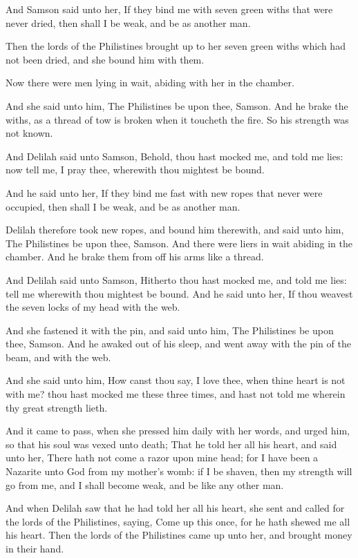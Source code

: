 \verse And Samson said unto her, If they bind me with seven green withs that were never dried, then shall I be weak, and be as another man.

\verse Then the lords of the Philistines brought up to her seven green withs which had not been dried, and she bound him with them.

\verse Now there were men lying in wait, abiding with her in the chamber.

And she said unto him, The Philistines be upon thee, Samson. And he brake the withs, as a thread of tow is broken when it toucheth the fire. So his strength was not known.

\verse And Delilah said unto Samson, Behold, thou hast mocked me, and told me lies: now tell me, I pray thee, wherewith thou mightest be bound.

\verse And he said unto her, If they bind me fast with new ropes that never were occupied, then shall I be weak, and be as another man.

\verse Delilah therefore took new ropes, and bound him therewith, and said unto him, The Philistines be upon thee, Samson. And there were liers in wait abiding in the chamber. And he brake them from off his arms like a thread.

\verse And Delilah said unto Samson, Hitherto thou hast mocked me, and told me lies: tell me wherewith thou mightest be bound. And he said unto her, If thou weavest the seven locks of my head with the web.

\verse And she fastened it with the pin, and said unto him, The Philistines be upon thee, Samson. And he awaked out of his sleep, and went away with the pin of the beam, and with the web.

\verse And she said unto him, How canst thou say, I love thee, when thine heart is not with me? thou hast mocked me these three times, and hast not told me wherein thy great strength lieth.

\verse And it came to pass, when she pressed him daily with her words, and urged him, so that his soul was vexed unto death; \verse That he told her all his heart, and said unto her, There hath not come a razor upon mine head; for I have been a Nazarite unto God from my mother's womb: if I be shaven, then my strength will go from me, and I shall become weak, and be like any other man.

\verse And when Delilah saw that he had told her all his heart, she sent and called for the lords of the Philistines, saying, Come up this once, for he hath shewed me all his heart. Then the lords of the Philistines came up unto her, and brought money in their hand.

